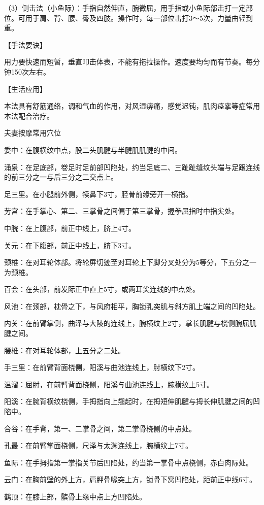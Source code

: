 \documentclass[12pt,UTF8]{ctexbook}
\begin{document}
（3）侧击法（小鱼际）：手指自然伸直，腕微屈，用手指或小鱼际部击打一定部位。可用于肩、背、腰、臀及四肢。操作时，每一部位击打3～5次，力量由轻到重。

【手法要诀】

用力要快速而短暂，垂直叩击体表，不能有拖拉操作。速度要均匀而有节奏。每分钟150次左右。

【生活应用】

本法具有舒筋通络，调和气血的作用，对风湿痹痛，感觉迟钝，肌肉痉挛等症常用本法配合治疗。





夫妻按摩常用穴位


委中：在腹横纹中点，股二头肌腱与半腱肌肌腱的中间。

涌泉：在足底部，卷足时足前部凹陷处，约当足底二、三趾趾缝纹头端与足跟连线的前三分之一与后三分之二交点上。

足三里。在小腿前外侧，犊鼻下3寸，胫骨前缘旁开一横指。

劳宫：在手掌心、第二、三掌骨之间偏于第三掌骨，握拳屈指时中指尖处。

中脘：在上腹部，前正中线上，脐上4寸。

关元：在下腹部，前正中线上，脐下3寸。

颈椎：在对耳轮体部。将轮屏切迹至对耳轮上下脚分叉处分为5等分，下五分之一为颈椎。

百会：在头部，前发际正中直上5寸，或两耳尖连线的中点处。

风池：在颈部，枕骨之下，与风府相平，胸锁乳突肌与斜方肌上端之间的凹陷处。

内关：在前臂掌侧，曲泽与大陵的连线上，腕横纹上2寸，掌长肌腱与桡侧腕屈肌腱之间。

腰椎：在对耳轮体部，上五分之二处。

手三里：在前臂背面桡侧，阳溪与曲池连线上，肘横纹下2寸。

温溜：屈肘，在前臂背面桡侧，阳溪与曲池连线上，腕横纹上5寸。

阳溪：在腕背横纹桡侧，手拇指向上翘起时，在拇短伸肌腱与拇长伸肌腱之间的凹陷中。

合谷：在手背，第一、二掌骨之间，第二掌骨桡侧的中点处。

孔最：在前臂掌面桡侧，尺泽与太渊连线上，腕横纹上7寸。

鱼际：在手拇指第一掌指关节后凹陷处，约当第一掌骨中点桡侧，赤白肉际处。

云门：在胸前壁的外上方，肩胛骨喙突上方，锁骨下窝凹陷处，距前正中线6寸。

鹤顶：在膝上部，髌骨上缘中点上方凹陷处。
\end{document}
